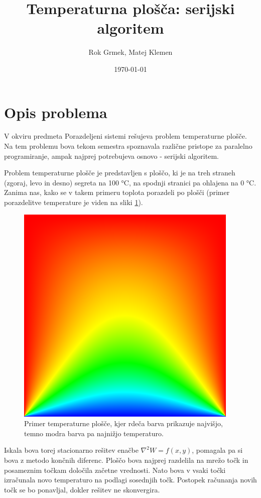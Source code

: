 \documentclass[a4paper,11pt]{article}
\title{Temperaturna plošča: serijski algoritem}
\author{Rok Grmek, Matej Klemen}
\date{\today}
\begin{document}
\maketitle

\section{Opis problema}

\indent \par V okviru predmeta Porazdeljeni sistemi rešujeva problem temperaturne plošče. Na tem problemu bova tekom semestra spoznavala različne pristope za paralelno programiranje, ampak najprej potrebujeva osnovo - serijski algoritem.

Problem temperaturne plošče je predstavljen s ploščo, ki je na treh straneh (zgoraj, levo in desno) segreta na 100 °C, na spodnji stranici pa ohlajena na 0 °C. Zanima nas, kako se v takem primeru toplota porazdeli po plošči (primer porazdelitve temperature je viden na sliki \ref{primer-temperaturne-plosce}).

\begin{figure}[H]
\begin{center}
\includegraphics[scale=0.6]{primer-temperaturne-plosce.png}
\end{center}
\caption{Primer temperaturne plošče, kjer rdeča barva prikazuje najvišjo, temno modra barva pa najnižjo temperaturo.}
\label{primer-temperaturne-plosce}
\end{figure}

Iskala bova torej stacionarno rešitev enačbe \(\nabla^2 W = f(x, y)\), pomagala pa si bova z metodo končnih diferenc. Ploščo bova najprej razdelila na mrežo točk in posameznim točkam določila začetne vrednosti. Nato bova v vsaki točki izračunala novo temperaturo na podlagi sosednjih točk. Postopek računanja novih točk se bo ponavljal, dokler rešitev ne skonvergira.
\end{document}
